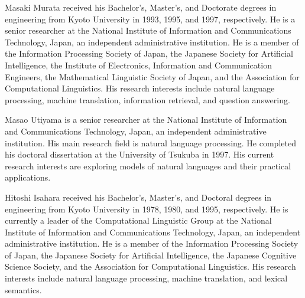 \begin{biography}

\biotitle{}

{
Masaki Murata received his Bachelor's,
  Master's, and Doctorate degrees in engineering from Kyoto University in 1993, 1995, 
  and 1997, respectively.  
He is a senior researcher at the National Institute of Information and Communications Technology, Japan, 
an independent administrative institution.  
He is a member of the Information Processing Society of Japan,
the Japanese Society for Artificial Intelligence, 
the Institute of Electronics, Information and Communication Engineers,
the Mathematical Linguistic Society of Japan, 
and the Association for Computational Linguistics.
His research interests include natural language processing, machine translation, 
information retrieval, and question answering.
}

{
Masao Utiyama is a senior researcher at the National Institute of
Information and Communications Technology, Japan, an independent administrative institution. 
His main research field is natural language processing. He completed his
doctoral dissertation at the University of Tsukuba in 1997. His
current research interests are exploring models of natural
languages and their practical applications.
}

{
Hitoshi Isahara received his Bachelor's,
Master's, and Doctoral degrees in engineering from Kyoto University in 1978, 1980,
and 1995, respectively.  He is currently a leader of the Computational Linguistic Group  
at the National Institute of Information and Communications Technology, Japan, 
an independent administrative institution.  
He is a member of the Information Processing Society of Japan, 
the Japanese Society for Artificial Intelligence, 
the Japanese Cognitive Science Society, 
and the Association for Computational Linguistics.
His research
interests include natural language processing, machine translation, and
lexical semantics.
}



\end{biography}



